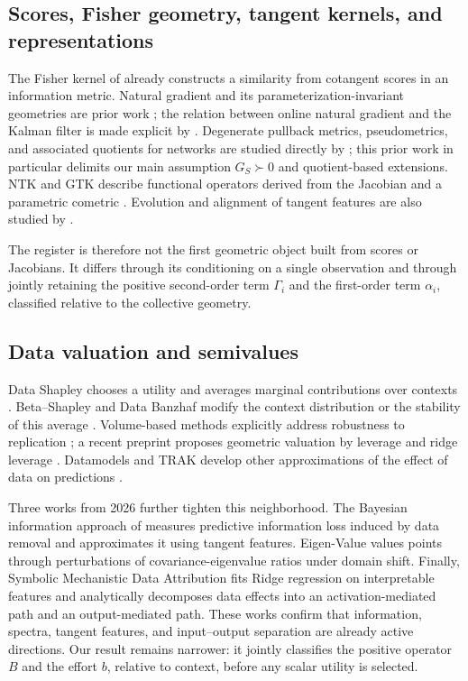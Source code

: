 \subsection{Scores, Fisher geometry, tangent kernels, and representations}
The Fisher kernel of \citet{jaakkola1998} already constructs a similarity from cotangent scores in an information metric. Natural gradient and its parameterization-invariant geometries are prior work \citep{amari1998,ollivier2015,martens2020}; the relation between online natural gradient and the Kalman filter is made explicit by \citet{ollivier2017}. Degenerate pullback metrics, pseudometrics, and associated quotients for networks are studied directly by \citet{benfenati2023singular}; this prior work in particular delimits our main assumption $G_S\succ0$ and quotient-based extensions. NTK and GTK describe functional operators derived from the Jacobian and a parametric cometric \citep{jacot2018,bai2025gtk}. Evolution and alignment of tangent features are also studied by \citet{baratin2021}.

The register is therefore not the first geometric object built from scores or Jacobians. It differs through its conditioning on a single observation and through jointly retaining the positive second-order term $\Gamma_i$ and the first-order term $\alpha_i$, classified relative to the collective geometry.

\subsection{Data valuation and semivalues}
Data Shapley chooses a utility and averages marginal contributions over contexts \citep{ghorbani2019}. Beta--Shapley and Data Banzhaf modify the context distribution or the stability of this average \citep{kwon2022,wang2023banzhaf}. Volume-based methods explicitly address robustness to replication \citep{xu2021volume}; a recent preprint proposes geometric valuation by leverage and ridge leverage \citep{mendozasmith2025}. Datamodels and TRAK develop other approximations of the effect of data on predictions \citep{ilyas2022,park2023trak}.

Three works from 2026 further tighten this neighborhood. The Bayesian information approach of \citet{tailor2026bayesian} measures predictive information loss induced by data removal and approximates it using tangent features. Eigen-Value \citep{choi2026eigenvalue} values points through perturbations of covariance-eigenvalue ratios under domain shift. Finally, Symbolic Mechanistic Data Attribution \citep{habibi2026smda} fits Ridge regression on interpretable features and analytically decomposes data effects into an activation-mediated path and an output-mediated path. These works confirm that information, spectra, tangent features, and input--output separation are already active directions. Our result remains narrower: it jointly classifies the positive operator $B$ and the effort $b$, relative to context, before any scalar utility is selected.

